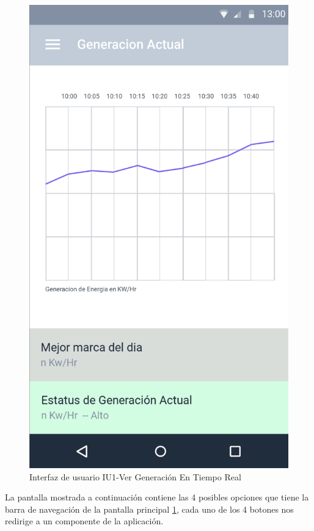 \begin{figure}[H]
	\centering
	\includegraphics[scale=0.70]{Capitulo4/software/submodulos/images/monitoreo.png}
	\caption{Interfaz de usuario IU1-Ver Generación En Tiempo Real}
	\label{fig:monitoreo}
\end{figure}

La pantalla mostrada a continuación contiene las 4 posibles opciones que tiene la barra de navegación de la pantalla principal \ref{fig:monitoreo}, cada uno de los 4 botones nos redirige a un componente de la aplicación.

